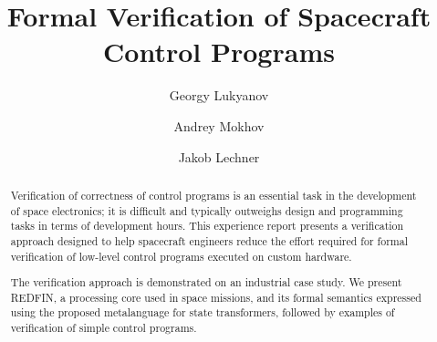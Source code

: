 \documentclass[acmsmall,screen]{acmart}
\begin{document}
\title[Formal Verification of Spacecraft Control Programs]{Formal Verification
of Spacecraft Control Programs}

\author{Georgy Lukyanov}
\author{Andrey Mokhov}
\author{Jakob Lechner}


\begin{abstract}
Verification of correctness of control programs is an essential task
in the development of space electronics; it is difficult and typically
outweighs design and programming tasks in terms of development hours.
This experience report presents a verification approach designed to help
spacecraft engineers reduce the effort required for formal verification of
low-level control programs executed on custom hardware.


The verification approach is demonstrated on an industrial case study.
We present REDFIN, a processing core used in space missions, and its formal
semantics expressed using the proposed metalanguage for state transformers,
followed by examples of verification of simple control programs.

\end{abstract}

\keywords{}

\maketitle











\end{document}
